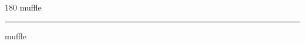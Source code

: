 
\begin{frame}
\begin{center}
\begin{turn}{180}
{\fontsize{2.5cm}{1em}\selectfont muffle}
\end{turn}
\vspace{1em}\par  
\hrule
\vspace{1em}\par  
{\fontsize{2.5cm}{1em}\selectfont muffle}
\end{center}
\end{frame}
